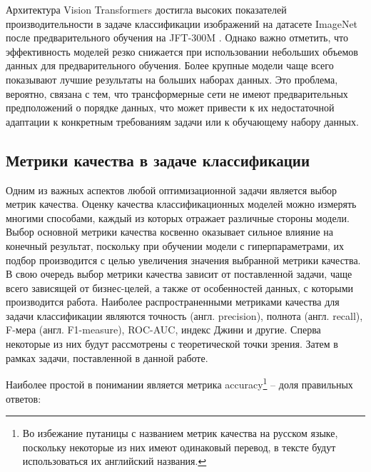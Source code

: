 \documentclass[a4paper,12pt]{extarticle}
\begin{document}
Архитектура Vision Transformers достигла высоких показателей производительности в задаче классификации изображений на датасете ImageNet после предварительного обучения на JFT-300M \cite{vit}. Однако важно отметить, что эффективность моделей резко снижается при использовании небольших объемов данных для предварительного обучения. Более крупные модели чаще всего показывают лучшие результаты на больших наборах данных. Это проблема, вероятно, связана с тем, что трансформерные сети не имеют предварительных предположений о порядке данных, что может привести к их недостаточной адаптации к конкретным требованиям задачи или к обучающему набору данных.



\subsection{Метрики качества в задаче классификации}\label{classification_metrics}
Одним из важных аспектов любой оптимизационной задачи является выбор метрик качества. Оценку качества классификационных моделей можно измерять многими способами, каждый из которых отражает различные стороны модели. Выбор основной метрики качества косвенно оказывает сильное влияние на конечный результат, поскольку при обучении модели с гиперпараметрами, их подбор производится с целью увеличения значения выбранной метрики качества. В свою очередь выбор метрики качества зависит от поставленной задачи, чаще всего зависящей от бизнес-целей, а также от особенностей данных, с которыми производится работа. Наиболее распространенными метриками качества для задачи классификации являются точность (англ. precision), полнота (англ. recall), F-мера (англ. F1-measure), ROC-AUC, индекс Джини и другие. Сперва некоторые из них будут рассмотрены с теоретической точки зрения. Затем в рамках задачи, поставленной в данной работе.

Наиболее простой в понимании является метрика accuracy\footnote{Во избежание путаницы с названием метрик качества на русском языке, поскольку некоторые из них имеют одинаковый перевод, в тексте будут использоваться их английский названия.} – доля правильных ответов:
\end{document}
